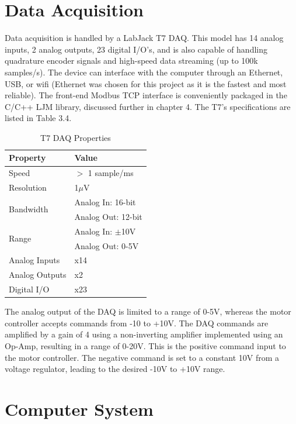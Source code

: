 \documentclass[12pt]{report}
\begin{document}
	
	\section{Data Acquisition} 

	Data acquisition is handled by a LabJack T7 DAQ. This model has 14 analog inputs, 2 analog outputs, 23 digital I/O's, and is also capable of handling quadrature encoder signals and high-speed data streaming (up to 100k samples/s). The device can interface with the computer through an Ethernet, USB, or wifi (Ethernet was chosen for this project as it is the fastest and most reliable). The front-end Modbus TCP interface is conveniently packaged in the C/C++ LJM library, discussed further in chapter 4. The T7's specifications are listed in Table 3.4.
	
		
	\begin{table}[h]
	\centering
	\caption{T7 DAQ Properties}	
	\begin{tabular}{|l|l|}
		\hline
		\rowcolor{gray!10} \textbf{Property} & \textbf{Value}  \\ \hline
 		Speed & $>$ 1 sample/ms \\ \hline
 		Resolution& 1$\mu $V \\ \hline
 		 \multirow{2}{*}{Bandwidth} & Analog In: 16-bit \\
 		 & Analog Out: 12-bit \\ \hline
 		 \multirow{2}{*}{Range} & Analog In: $\pm $10V \\
 		 & Analog Out: 0-5V \\ \hline
 		 Analog Inputs & x14 \\ \hline
 		 Analog Outputs & x2 \\ \hline
 		 Digital I/O  & x23 \\ \hline
		\end{tabular}
	\label{tab:T7}
	\end{table}
	
	The analog output of the DAQ is limited to a range of 0-5V, whereas the motor controller accepts commands from -10 to +10V. The DAQ commands are amplified by a gain of 4 using a non-inverting amplifier implemented using an Op-Amp, resulting in a range of 0-20V. This is the positive command input to the motor controller. The negative command is set to a constant 10V from a voltage regulator, leading to the desired -10V to +10V range. 
	


	\section{Computer System}
\end{document}
